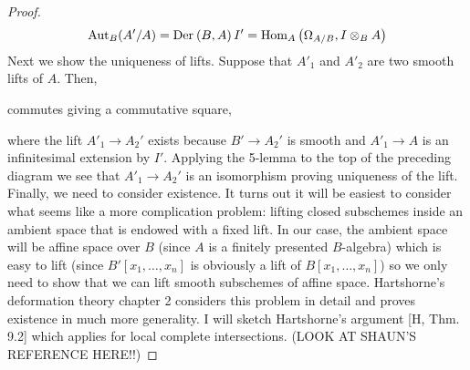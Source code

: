 \documentclass[12pt]{article}
\begin{document}
\begin{proof}
\[ \mathrm{Aut}_B(A'/A) = \mathrm{Der}_{} \left( B, A \right){I'} = \mathrm{Hom}_{A} \left( \Omega_{A/B}, I \otimes_B A \right) \]
Next we show the uniqueness of lifts. Suppose that $A'_1$ and $A'_2$ are two smooth lifts of $A$. Then,
\begin{center}
\end{center}
commutes giving a commutative square,
\begin{center}
\end{center}
where the lift $A'_1 \to A_2'$ exists because $B' \to A_2'$ is smooth and $A'_1 \to A$ is an infinitesimal extension by $I'$. Applying the 5-lemma to the top of the preceding diagram we see that $A'_1 \to A_2'$ is an isomorphism proving uniqueness of the lift.
\bigskip\\
Finally, we need to consider existence. It turns out it will be easiest to consider what seems like a more complication problem: lifting closed subschemes inside an ambient space that is endowed with a fixed lift. In our case, the ambient space will be affine space over $B$ (since $A$ is a finitely presented $B$-algebra) which is easy to lift (since $B'[x_1, \dots, x_n]$ is obviously a lift of $B[x_1, \dots, x_n]$) so we only need to show that we can lift smooth subschemes of affine space. Hartshorne's deformation theory chapter 2 considers this problem in detail and proves existence in much more generality. I will sketch Hartshorne's argument [H, Thm. 9.2] which applies for local complete intersections. (LOOK AT SHAUN'S REFERENCE HERE!!)

\end{proof}
\end{document}
